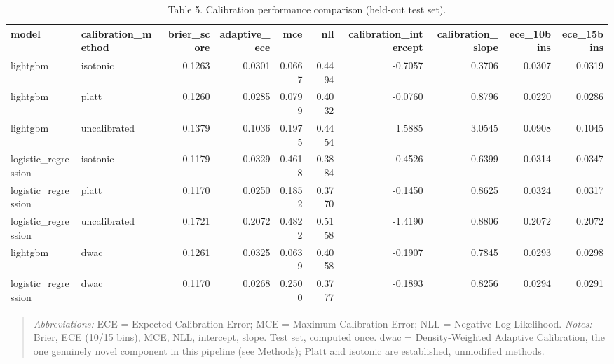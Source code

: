 \begin{table}[htbp]
\centering
\caption{Table 5. Calibration performance comparison (held-out test set).}
\label{table5_calibration_performance_test}
\begin{tabular}{llrrrrrrrr}
\toprule
model & calibration\_method & brier\_score & adaptive\_ece & mce & nll & calibration\_intercept & calibration\_slope & ece\_10bins & ece\_15bins \\
\midrule
lightgbm & isotonic & 0.1263 & 0.0301 & 0.0667 & 0.4494 & -0.7057 & 0.3706 & 0.0307 & 0.0319 \\
lightgbm & platt & 0.1260 & 0.0285 & 0.0799 & 0.4032 & -0.0760 & 0.8796 & 0.0220 & 0.0286 \\
lightgbm & uncalibrated & 0.1379 & 0.1036 & 0.1975 & 0.4454 & 1.5885 & 3.0545 & 0.0908 & 0.1045 \\
logistic\_regression & isotonic & 0.1179 & 0.0329 & 0.4618 & 0.3884 & -0.4526 & 0.6399 & 0.0314 & 0.0347 \\
logistic\_regression & platt & 0.1170 & 0.0250 & 0.1852 & 0.3770 & -0.1450 & 0.8625 & 0.0324 & 0.0317 \\
logistic\_regression & uncalibrated & 0.1721 & 0.2072 & 0.4822 & 0.5158 & -1.4190 & 0.8806 & 0.2072 & 0.2072 \\
lightgbm & dwac & 0.1261 & 0.0325 & 0.0639 & 0.4058 & -0.1907 & 0.7845 & 0.0293 & 0.0298 \\
logistic\_regression & dwac & 0.1170 & 0.0268 & 0.2500 & 0.3777 & -0.1893 & 0.8256 & 0.0294 & 0.0291 \\
\bottomrule
\end{tabular}

\end{table}


\begin{quote}\small
\textit{Abbreviations:} ECE = Expected Calibration Error; MCE = Maximum Calibration Error; NLL = Negative Log-Likelihood.
\textit{Notes:} Brier, ECE (10/15 bins), MCE, NLL, intercept, slope. Test set, computed once. dwac = Density-Weighted Adaptive Calibration, the one genuinely novel component in this pipeline (see Methods); Platt and isotonic are established, unmodified methods.
\end{quote}